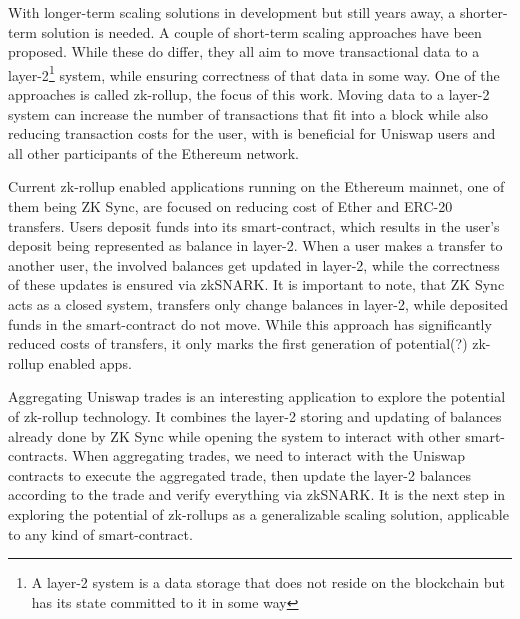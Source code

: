 \documentclass[../../thesis.tex]{subfiles}
\begin{document}
With longer-term scaling solutions in development but still years away, a shorter-term solution is needed. A couple of short-term scaling approaches have been proposed. While these do differ, they all aim to move transactional data to a layer-2\footnote{A layer-2 system is a data storage that does not reside on the blockchain but has its state committed to it in some way} system, while ensuring correctness of that data in some way. One of the approaches is called zk-rollup, the focus of this work. Moving data to a layer-2 system can increase the number of transactions that fit into a block while also reducing transaction costs for the user, with is beneficial for Uniswap users and all other participants of the Ethereum network. 

Current zk-rollup enabled applications running on the Ethereum mainnet, one of them being ZK Sync, are focused on reducing cost of Ether and ERC-20 transfers. Users deposit funds into its smart-contract, which results in the user's deposit being represented as balance in layer-2. When a user makes a transfer to another user, the involved balances get updated in layer-2, while the correctness of these updates is ensured via zkSNARK. It is important to note, that ZK Sync acts as a closed system, transfers only change balances in layer-2, while deposited funds in the smart-contract do not move. While this approach has significantly reduced costs of transfers, it only marks the first generation of potential(?) zk-rollup enabled apps.

Aggregating Uniswap trades is an interesting application to explore the potential of zk-rollup technology. It combines the layer-2 storing and updating of balances already done by ZK Sync while opening the system to interact with other smart-contracts. When aggregating trades, we need to interact with the Uniswap contracts to execute the aggregated trade, then update the layer-2 balances according to the trade and verify everything via zkSNARK. It is the next step in exploring the potential of zk-rollups as a generalizable scaling solution, applicable to any kind of smart-contract. 
\end{document}
